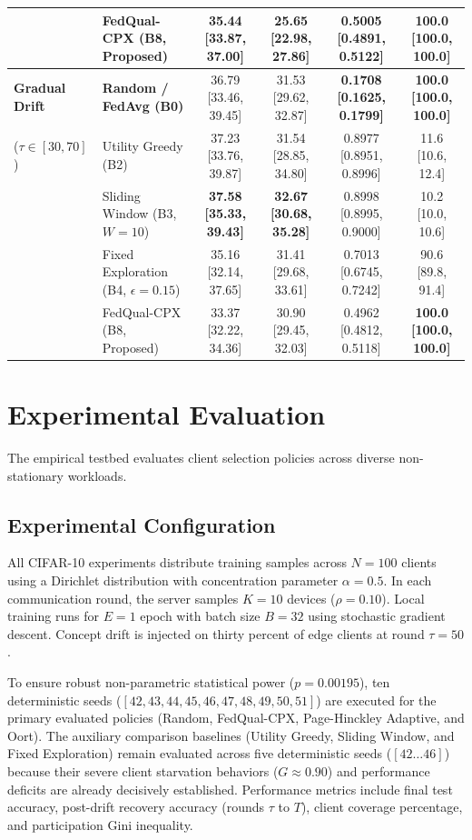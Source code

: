 \documentclass[conference]{IEEEtran}
\begin{document}
\begin{table}[t]
\begin{tabular}{llcccc}
& FedQual-CPX (B8, Proposed) & 35.44 [33.87, 37.00] & 25.65 [22.98, 27.86] & 0.5005 [0.4891, 0.5122] & \textbf{100.0 [100.0, 100.0]} \\
\midrule
\textbf{Gradual Drift} & \textbf{Random / FedAvg (B0)} & 36.79 [33.46, 39.45] & 31.53 [29.62, 32.87] & \textbf{0.1708 [0.1625, 0.1799]} & \textbf{100.0 [100.0, 100.0]} \\
($\tau \in [30, 70]$) & Utility Greedy (B2) & 37.23 [33.76, 39.87] & 31.54 [28.85, 34.80] & 0.8977 [0.8951, 0.8996] & 11.6 [10.6, 12.4] \\
& Sliding Window (B3, $W=10$) & \textbf{37.58 [35.33, 39.43]} & \textbf{32.67 [30.68, 35.28]} & 0.8998 [0.8995, 0.9000] & 10.2 [10.0, 10.6] \\
& Fixed Exploration (B4, $\epsilon=0.15$) & 35.16 [32.14, 37.65] & 31.41 [29.68, 33.61] & 0.7013 [0.6745, 0.7242] & 90.6 [89.8, 91.4] \\
& FedQual-CPX (B8, Proposed) & 33.37 [32.22, 34.36] & 30.90 [29.45, 32.03] & 0.4962 [0.4812, 0.5118] & \textbf{100.0 [100.0, 100.0]} \\
\bottomrule
\end{tabular}
\end{table}

\section{Experimental Evaluation}
The empirical testbed evaluates client selection policies across diverse non-stationary workloads.

\subsection{Experimental Configuration}
All CIFAR-10 experiments distribute training samples across $N=100$ clients using a Dirichlet distribution with concentration parameter $\alpha = 0.5$. In each communication round, the server samples $K = 10$ devices ($\rho = 0.10$). Local training runs for $E = 1$ epoch with batch size $B = 32$ using stochastic gradient descent. Concept drift is injected on thirty percent of edge clients at round $\tau = 50$.

To ensure robust non-parametric statistical power ($p = 0.00195$), ten deterministic seeds ($[42, 43, 44, 45, 46, 47, 48, 49, 50, 51]$) are executed for the primary evaluated policies (Random, FedQual-CPX, Page-Hinckley Adaptive, and Oort). The auxiliary comparison baselines (Utility Greedy, Sliding Window, and Fixed Exploration) remain evaluated across five deterministic seeds ($[42 \dots 46]$) because their severe client starvation behaviors ($G \approx 0.90$) and performance deficits are already decisively established. Performance metrics include final test accuracy, post-drift recovery accuracy (rounds $\tau$ to $T$), client coverage percentage, and participation Gini inequality.
\end{document}
